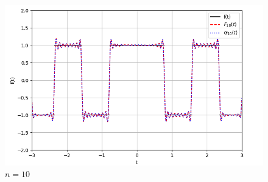 \documentclass[a4paper]{article}
\begin{document}
\begin{figure}[H]
\begin{minipage}{0.5\textwidth}
        \caption{$n = 5$}
    \end{minipage}\hfill
    \begin{minipage}{0.5\textwidth}
        \centering \includegraphics[width=\textwidth]{even_func/10.png}
        \caption{$n = 10$}
    \end{minipage}
\end{figure}
\end{document}
